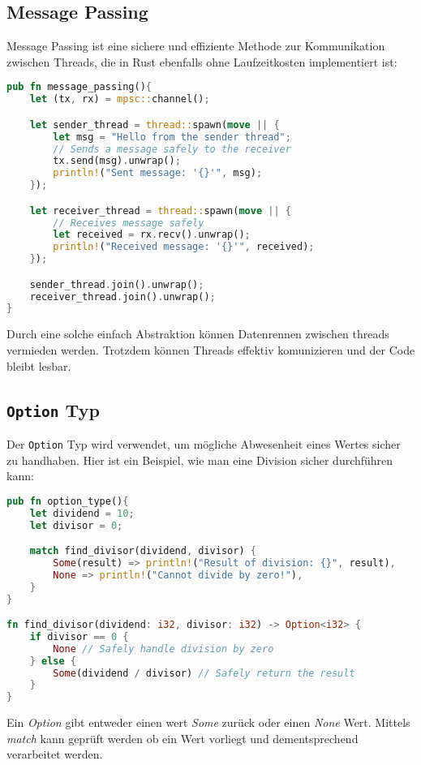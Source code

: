 \subsection{Message Passing}

Message Passing ist eine sichere und effiziente Methode zur Kommunikation zwischen Threads, die in Rust ebenfalls ohne Laufzeitkosten implementiert ist:

\begin{lstlisting}[language=Rust, caption=Message Passing Beispiel]
pub fn message_passing(){
    let (tx, rx) = mpsc::channel();

    let sender_thread = thread::spawn(move || {
        let msg = "Hello from the sender thread";
        // Sends a message safely to the receiver
        tx.send(msg).unwrap(); 
        println!("Sent message: '{}'", msg);
    });

    let receiver_thread = thread::spawn(move || {
        // Receives message safely
        let received = rx.recv().unwrap(); 
        println!("Received message: '{}'", received);
    });

    sender_thread.join().unwrap();
    receiver_thread.join().unwrap();
}
\end{lstlisting}
Durch eine solche einfach Abstraktion können Datenrennen zwischen threads vermieden werden.
Trotzdem können Threads effektiv komunizieren und der Code bleibt lesbar.
\subsection{\texttt{Option} Typ}

Der \texttt{Option} Typ wird verwendet, um mögliche Abwesenheit eines Wertes sicher zu handhaben. Hier ist ein Beispiel, wie man eine Division sicher durchführen kann:

\begin{lstlisting}[language=Rust, caption=Option Typ Beispiel]
pub fn option_type(){
    let dividend = 10;
    let divisor = 0;

    match find_divisor(dividend, divisor) {
        Some(result) => println!("Result of division: {}", result),
        None => println!("Cannot divide by zero!"),
    }
}

fn find_divisor(dividend: i32, divisor: i32) -> Option<i32> {
    if divisor == 0 {
        None // Safely handle division by zero
    } else {
        Some(dividend / divisor) // Safely return the result
    }
}
\end{lstlisting}
\noindent
Ein \textit{Option} gibt entweder einen wert \textit{Some} zurück oder einen \textit{None} Wert.
Mittels \textit{match} kann geprüft werden ob ein Wert vorliegt und dementsprechend verarbeitet werden.

